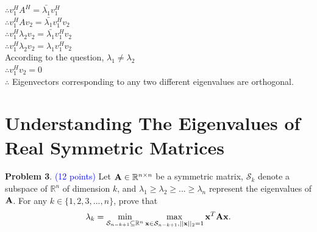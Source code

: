 \documentclass[english,onecolumn]{IEEEtran}
\newcommand{\Rbb}{\mathbb{R}}
\newcommand{\bigS}{\mathcal{S}}
\newcommand{\bA}{{\bf A}}
\newcommand{\bx}{{\bf x}}
\begin{document}
\begin{enumerate}
    	$\therefore v_1^HA^H=\bar{\lambda_1}v_1^H$\\
    	$\therefore v_1^HAv_2=\bar{\lambda_1}v_1^Hv_2$\\
    	$\therefore v_1^H\lambda_2v_2=\bar{\lambda_1}v_1^Hv_2$\\
			$\therefore v_1^H\lambda_2v_2=\lambda_1v_1^Hv_2$\\
    	According to the question, $\lambda_1\neq\lambda_2$\\
    	$\therefore v_1^Hv_2=0$\\
    	$\therefore$ Eigenvectors corresponding to any two different eigenvalues are orthogonal.\\
\end{enumerate}

\clearpage
\section{Understanding The Eigenvalues of Real Symmetric Matrices}
\noindent\textbf{Problem 3}. \textcolor{blue}{(12 points)}
\noindent 
Let $\bA\in \Rbb^{n\times n}$ be a symmetric matrix, $\bigS_k$ denote a subspace of $\Rbb^n$ of dimension $k$, and $\lambda_1\geq \lambda_2\geq...\geq \lambda_n$ represent the eigenvalues of $\bA$. 
For any $k\in\{1,2,3,...,n\}$, prove that \[\lambda_k=\min\limits_{\bigS_{n-k+1}\subseteq \Rbb^n}\max\limits_{\bx\in\bigS_{n-k+1},||\bx||_2=1} \bx^T\bA\bx.\]
\end{document}

